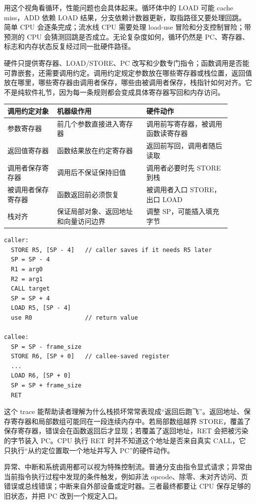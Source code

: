 用这个视角看循环，性能问题也会具体起来。循环体中的 LOAD 可能 cache miss，ADD 依赖 LOAD 结果，分支依赖计数器更新，取指路径又要处理回跳。简单 CPU 会逐条完成；流水线 CPU 需要处理 load-use 冒险和分支控制冒险；带预测的 CPU 会猜测回跳是否成立。无论复杂度如何，循环仍然是 PC、寄存器、标志和内存状态反复经过同一批硬件路径。

硬件只提供寄存器、LOAD/STORE、PC 改写和少数专门指令；函数调用是否能可靠嵌套，还需要调用约定。调用约定规定参数放在哪些寄存器或栈位置，返回值放在哪里，哪些寄存器由调用者保存，哪些由被调用者保存，栈指针如何对齐。它不是纯软件礼节，因为每一条规则都会变成具体寄存器写回和内存访问。

\begin{longtable}{L{0.2\linewidth}L{0.36\linewidth}L{0.34\linewidth}}
\toprule
调用约定对象 & 机器级作用 & 硬件动作 \\
\midrule
参数寄存器 & 前几个参数直接进入寄存器 & 调用前写寄存器，被调用函数读寄存器 \\
返回值寄存器 & 函数结果放在约定寄存器 & 返回前写回，调用者随后读取 \\
调用者保存寄存器 & 调用后不保证保持旧值 & 调用者必要时先 STORE 到栈 \\
被调用者保存寄存器 & 函数返回前必须恢复 & 被调用者入口 STORE，出口 LOAD \\
栈对齐 & 保证局部对象、返回地址和向量访问边界 & 调整 SP，可能插入填充字节 \\
\bottomrule
\end{longtable}

\begin{lstlisting}
caller:
  STORE R5, [SP - 4]   // caller saves if it needs R5 later
  SP = SP - 4
  R1 = arg0
  R2 = arg1
  CALL target
  SP = SP + 4
  LOAD R5, [SP - 4]
  use R0               // return value

callee:
  SP = SP - frame_size
  STORE R6, [SP + 0]   // callee-saved register
  ...
  LOAD R6, [SP + 0]
  SP = SP + frame_size
  RET
\end{lstlisting}

这个 trace 能帮助读者理解为什么栈损坏常常表现成“返回后跑飞”。返回地址、保存寄存器和局部数组可能同在一段连续内存中。若局部数组越界 STORE，覆盖了保存寄存器，错误会在函数返回后才显现；若覆盖了返回地址，RET 会把被污染的字节装入 PC。CPU 执行 RET 时并不知道这个地址是否来自真实 CALL，它只执行“从约定位置取一个地址并写入 PC”的硬件动作。

异常、中断和系统调用都可以视为特殊控制流。普通分支由指令显式请求；异常由当前指令执行过程中发现的条件触发，例如非法 opcode、除零、未对齐访问、页错误或总线错误；中断来自外部设备或定时器。三者最终都要让 CPU 保存足够的旧状态，并把 PC 改到一个规定入口。

